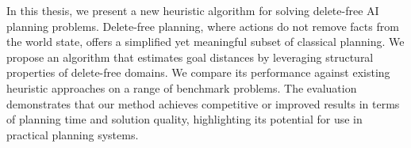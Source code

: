In this thesis, we present a new heuristic algorithm for solving delete-free AI planning problems.
Delete-free planning, where actions do not remove facts from the world state, offers a simplified yet
meaningful subset of classical planning. We propose an algorithm that estimates goal distances by
leveraging structural properties of delete-free domains. We compare its performance against
existing heuristic approaches on a range of benchmark problems. The evaluation demonstrates that our
method achieves competitive or improved results in terms of planning time and solution quality,
highlighting its potential for use in practical planning systems.
